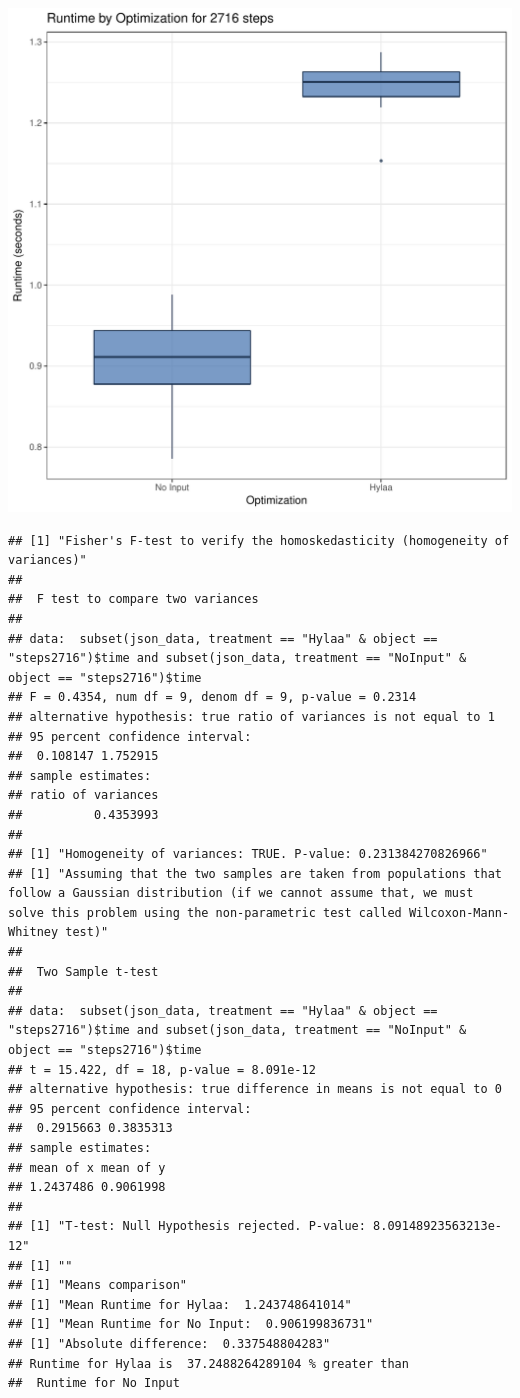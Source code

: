 \documentclass{article}\usepackage[]{graphicx}\usepackage[]{color}
\makeatletter
\def\maxwidth{ %
  \ifdim\Gin@nat@width>\linewidth
    \linewidth
  \else
    \Gin@nat@width
  \fi
}
\newenvironment{kframe}{%
 \def\at@end@of@kframe{}%
 \ifinner\ifhmode%
  \def\at@end@of@kframe{\end{minipage}}%
  \begin{minipage}{\columnwidth}%
 \fi\fi%
 \def\FrameCommand##1{\hskip\@totalleftmargin \hskip-\fboxsep
 \colorbox{shadecolor}{##1}\hskip-\fboxsep
     \hskip-\linewidth \hskip-\@totalleftmargin \hskip\columnwidth}%
 \MakeFramed {\advance\hsize-\width
   \@totalleftmargin\z@ \linewidth\hsize
   \@setminipage}}%
 {\par\unskip\endMakeFramed%
 \at@end@of@kframe}
\newenvironment{knitrout}{}{} %
\makeatother
\begin{document}
\begin{knitrout}
\color{fgcolor}
\includegraphics[width=\maxwidth]{figure/RH4_steps2716-1} 
\begin{kframe}\begin{verbatim}
## [1] "Fisher's F-test to verify the homoskedasticity (homogeneity of variances)"
## 
## 	F test to compare two variances
## 
## data:  subset(json_data, treatment == "Hylaa" & object == "steps2716")$time and subset(json_data, treatment == "NoInput" & object == "steps2716")$time
## F = 0.4354, num df = 9, denom df = 9, p-value = 0.2314
## alternative hypothesis: true ratio of variances is not equal to 1
## 95 percent confidence interval:
##  0.108147 1.752915
## sample estimates:
## ratio of variances 
##          0.4353993 
## 
## [1] "Homogeneity of variances: TRUE. P-value: 0.231384270826966"
## [1] "Assuming that the two samples are taken from populations that follow a Gaussian distribution (if we cannot assume that, we must solve this problem using the non-parametric test called Wilcoxon-Mann-Whitney test)"
## 
## 	Two Sample t-test
## 
## data:  subset(json_data, treatment == "Hylaa" & object == "steps2716")$time and subset(json_data, treatment == "NoInput" & object == "steps2716")$time
## t = 15.422, df = 18, p-value = 8.091e-12
## alternative hypothesis: true difference in means is not equal to 0
## 95 percent confidence interval:
##  0.2915663 0.3835313
## sample estimates:
## mean of x mean of y 
## 1.2437486 0.9061998 
## 
## [1] "T-test: Null Hypothesis rejected. P-value: 8.09148923563213e-12"
## [1] ""
## [1] "Means comparison"
## [1] "Mean Runtime for Hylaa:  1.243748641014"
## [1] "Mean Runtime for No Input:  0.906199836731"
## [1] "Absolute difference:  0.337548804283"
## Runtime for Hylaa is  37.2488264289104 % greater than 
##  Runtime for No Input
\end{verbatim}
\end{kframe}
\end{knitrout}
\end{document}
